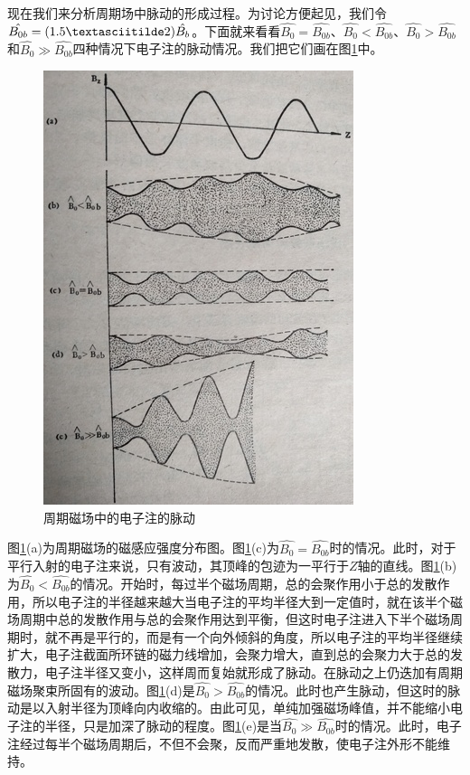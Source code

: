 现在我们来分析周期场中脉动的形成过程。为讨论方便起见，我们令$ \hat{B_{0b}} = (1.5\textasciitilde 2)\hat{B_{b}} $。下面就来看看$ \hat{B_0} = \hat{B_{0b}} $、$ \hat{B_0} < \hat{B_{0b}} $、$ \hat{B_0} > \hat{B_{0b}} $和$ \hat{B_0} \gg \hat{B_{0b}} $四种情况下电子注的脉动情况。我们把它们画在图\ref{ch7-21}中。
\begin{figure}[phtb]
	\centering
	\includegraphics[width=0.6\linewidth]{figure/ch7-21}
	\caption{周期磁场中的电子注的脉动}
	\label{ch7-21}
\end{figure}

图\ref{ch7-21}(a)为周期磁场的磁感应强度分布图。图\ref{ch7-21}(c)为$ \hat{B_0} = \hat{B_{0b}} $时的情况。此时，对于平行入射的电子注来说，只有波动，其顶峰的包迹为一平行于$ Z $轴的直线。图\ref{ch7-21}(b)为$ \hat{B_0} < \hat{B_{0b}} $的情况。开始时，每过半个磁场周期，总的会聚作用小于总的发散作用，所以电子注的半径越来越大当电子注的平均半径大到一定值时，就在该半个磁场周期中总的发散作用与总的会聚作用达到平衡，但这时电子注进入下半个磁场周期时，就不再是平行的，而是有一个向外倾斜的角度，所以电子注的平均半径继续扩大，电子注截面所环链的磁力线增加，会聚力增大，直到总的会聚力大于总的发散力，电子注半径又变小，这样周而复始就形成了脉动。在脉动之上仍迭加有周期磁场聚束所固有的波动。图\ref{ch7-21}(d)是$ \hat{B_0} > \hat{B_{0b}} $的情况。此时也产生脉动，但这时的脉动是以入射半径为顶峰向内收缩的。由此可见，单纯加强磁场峰值，并不能缩小电子注的半径，只是加深了脉动的程度。图\ref{ch7-21}(e)是当$ \hat{B_0} \gg \hat{B_{0b}} $时的情况。此时，电子注经过每半个磁场周期后，不但不会聚，反而严重地发散，使电子注外形不能维持。


